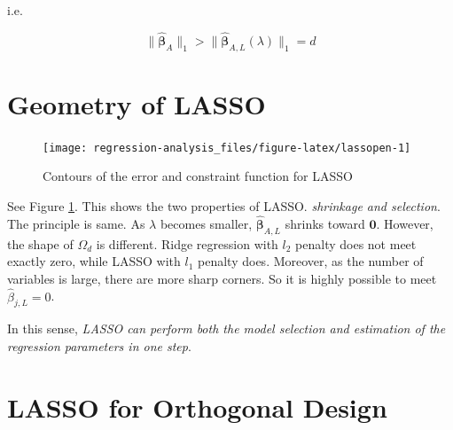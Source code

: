 \documentclass[]{book}
\theoremstyle{definition}
\theoremstyle{definition}
\theoremstyle{definition}
\theoremstyle{remark}
\begin{document}
i.e.

\[\lVert \boldsymbol{\hat\beta}_{A} \rVert_1 > \lVert \boldsymbol{\hat\beta}_{A, L}(\lambda) \rVert_1 = d\]

\hypertarget{geometry-of-lasso}{%
\section{Geometry of LASSO}\label{geometry-of-lasso}}

\begin{figure}[H]

{\centering \texttt{[image: regression-analysis\_files/figure-latex/lassopen-1]} 

}

\caption{Contours of the error and constraint function for LASSO}\label{fig:lassopen}
\end{figure}

See Figure \ref{fig:lassopen}. This shows the two properties of LASSO. \emph{shrinkage and selection}. The principle is same. As \(\lambda\) becomes smaller, \(\boldsymbol{\hat\beta}_{A,L}\) shrinks toward \(\mathbf{0}\). However, the shape of \(\Omega_d\) is different. Ridge regression with \(l_2\) penalty does not meet exactly zero, while LASSO with \(l_1\) penalty does. Moreover, as the number of variables is large, there are more sharp corners. So it is highly possible to meet \(\hat\beta_{j, L} = 0\).

In this sense, \emph{LASSO can perform both the model selection and estimation of the regression parameters in one step}.

\hypertarget{lasso-for-orthogonal-design}{%
\section{LASSO for Orthogonal Design}\label{lasso-for-orthogonal-design}}


\end{document}
